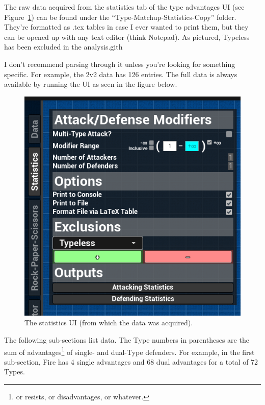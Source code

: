\newpage

The raw data acquired from the statistics tab of the type advantages UI (see Figure~\ref{fig:stats-ui}) can be found under the ``Type-Matchup-Statistics-Copy'' folder. They're formatted as .tex tables in case I ever wanted to print them, but they can be opened up with any text editor (think Notepad). As pictured, Typeless has been excluded in the analysis.gith

I don't recommend parsing through it unless you're looking for something specific. For example, the 2v2 data has 126 entries. The full data is always available by running the UI as seen in the figure below.

\begin{figure}[H]
	\begin{center}
		\includegraphics[scale=2]{statistics-ui}
		\caption{The statistics UI (from which the data was acquired).}
		\label{fig:stats-ui}
	\end{center}
\end{figure}

The following sub-sections list data. The Type numbers in parentheses are the sum of advantages\footnote{or resists, or disadvantages, or whatever.} of single- and dual-Type defenders. For example, in the first sub-section, Fire has 4 single advantages and 68 dual advantages for a total of 72 Types.

